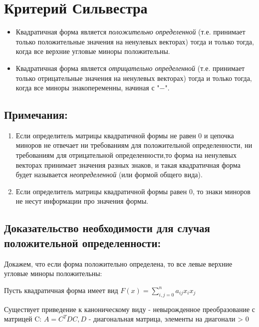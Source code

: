\documentclass[12pt]{article}
\begin{document}
    \section{Критерий Сильвестра}
    \begin{itemize}
        \item Квадратичная форма является
              \textit{положительно определенной} (т.е.
              принимает только положительные значения
              на ненулевых векторах) тогда и только тогда,
              когда все верхние угловые миноры положительны.
        \item Квадратичная форма является
              \textit{отрицательно определенной} (т.е.
              принимает только отрицательные значения
              на ненулевых векторах) тогда и только тогда,
              когда все миноры знакопеременны, начиная с "$-$".
    \end{itemize}
    \subsection{Примечания:}

    \begin{enumerate}
        \item Если определитель матрицы квадратичной формы не равен 0 и цепочка миноров не отвечает ни требованиям для положительной определенности, ни требованиям для отрицательной определенности,то форма на ненулевых векторах принимает значения разных знаков, и такая квадратичная форма будет называется  \textit{неопределенной} (или формой общего вида).
        \item Если определитель матрицы квадратичной формы равен 0, то знаки миноров не несут информации про значения формы.
    \end{enumerate}

    \subsection{Доказательство необходимости для случая положительной определенности:}

    Докажем, что если форма положительно определена, то все левые верхние угловые миноры положительны:

    Пусть квадратичная форма имеет вид $F(x) = \sum\limits_{i,j=0}^n a_{ij} x_{i} x_{j}$

    Существует приведение к каноническому виду - невырожденное преобразование с матрицей C:
    $A = C^{T}DC, D$ - диагональная матрица, элементы на диагонали > 0
\end{document}
